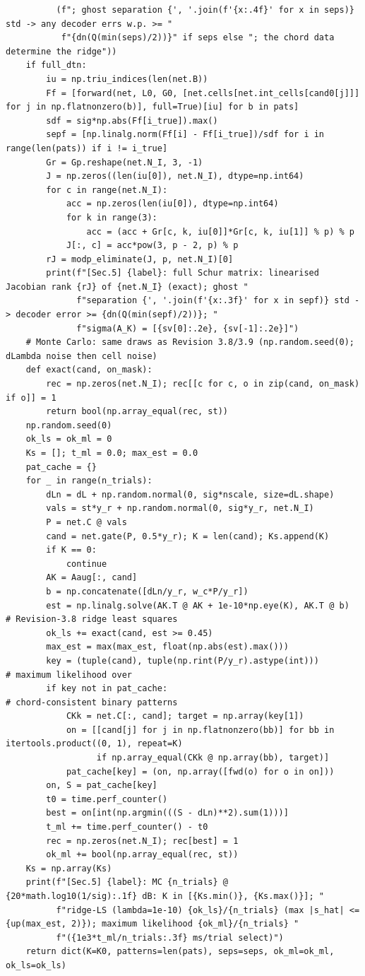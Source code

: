 \documentclass[11pt,a4paper]{article}
\theoremstyle{definition}
\theoremstyle{remark}
\begin{document}
\begin{lstlisting}
          (f"; ghost separation {', '.join(f'{x:.4f}' for x in seps)} std -> any decoder errs w.p. >= "
           f"{dn(Q(min(seps)/2))}" if seps else "; the chord data determine the ridge"))
    if full_dtn:
        iu = np.triu_indices(len(net.B))
        Ff = [forward(net, L0, G0, [net.cells[net.int_cells[cand0[j]]] for j in np.flatnonzero(b)], full=True)[iu] for b in pats]
        sdf = sig*np.abs(Ff[i_true]).max()
        sepf = [np.linalg.norm(Ff[i] - Ff[i_true])/sdf for i in range(len(pats)) if i != i_true]
        Gr = Gp.reshape(net.N_I, 3, -1)
        J = np.zeros((len(iu[0]), net.N_I), dtype=np.int64)
        for c in range(net.N_I):
            acc = np.zeros(len(iu[0]), dtype=np.int64)
            for k in range(3):
                acc = (acc + Gr[c, k, iu[0]]*Gr[c, k, iu[1]] % p) % p
            J[:, c] = acc*pow(3, p - 2, p) % p
        rJ = modp_eliminate(J, p, net.N_I)[0]
        print(f"[Sec.5] {label}: full Schur matrix: linearised Jacobian rank {rJ} of {net.N_I} (exact); ghost "
              f"separation {', '.join(f'{x:.3f}' for x in sepf)} std -> decoder error >= {dn(Q(min(sepf)/2))}; "
              f"sigma(A_K) = [{sv[0]:.2e}, {sv[-1]:.2e}]")
    # Monte Carlo: same draws as Revision 3.8/3.9 (np.random.seed(0); dLambda noise then cell noise)
    def exact(cand, on_mask):
        rec = np.zeros(net.N_I); rec[[c for c, o in zip(cand, on_mask) if o]] = 1
        return bool(np.array_equal(rec, st))
    np.random.seed(0)
    ok_ls = ok_ml = 0
    Ks = []; t_ml = 0.0; max_est = 0.0
    pat_cache = {}
    for _ in range(n_trials):
        dLn = dL + np.random.normal(0, sig*nscale, size=dL.shape)
        vals = st*y_r + np.random.normal(0, sig*y_r, net.N_I)
        P = net.C @ vals
        cand = net.gate(P, 0.5*y_r); K = len(cand); Ks.append(K)
        if K == 0:
            continue
        AK = Aaug[:, cand]
        b = np.concatenate([dLn/y_r, w_c*P/y_r])
        est = np.linalg.solve(AK.T @ AK + 1e-10*np.eye(K), AK.T @ b)      # Revision-3.8 ridge least squares
        ok_ls += exact(cand, est >= 0.45)
        max_est = max(max_est, float(np.abs(est).max()))
        key = (tuple(cand), tuple(np.rint(P/y_r).astype(int)))             # maximum likelihood over
        if key not in pat_cache:                                           # chord-consistent binary patterns
            CKk = net.C[:, cand]; target = np.array(key[1])
            on = [[cand[j] for j in np.flatnonzero(bb)] for bb in itertools.product((0, 1), repeat=K)
                  if np.array_equal(CKk @ np.array(bb), target)]
            pat_cache[key] = (on, np.array([fwd(o) for o in on]))
        on, S = pat_cache[key]
        t0 = time.perf_counter()
        best = on[int(np.argmin(((S - dLn)**2).sum(1)))]
        t_ml += time.perf_counter() - t0
        rec = np.zeros(net.N_I); rec[best] = 1
        ok_ml += bool(np.array_equal(rec, st))
    Ks = np.array(Ks)
    print(f"[Sec.5] {label}: MC {n_trials} @ {20*math.log10(1/sig):.1f} dB: K in [{Ks.min()}, {Ks.max()}]; "
          f"ridge-LS (lambda=1e-10) {ok_ls}/{n_trials} (max |s_hat| <= {up(max_est, 2)}); maximum likelihood {ok_ml}/{n_trials} "
          f"({1e3*t_ml/n_trials:.3f} ms/trial select)")
    return dict(K=K0, patterns=len(pats), seps=seps, ok_ml=ok_ml, ok_ls=ok_ls)



\end{lstlisting}
\end{document}
